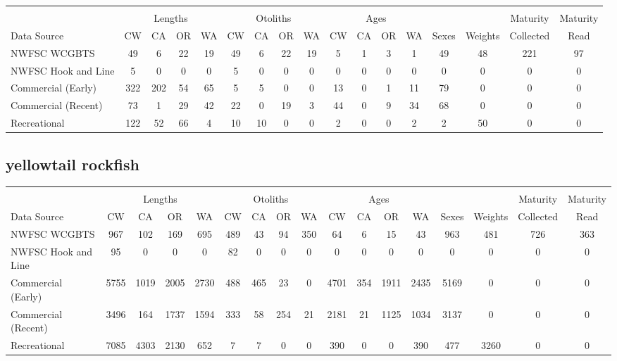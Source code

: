 \documentclass[12pt,]{article}
\begin{document}
\begin{table}[ht]
\centering
\begingroup\fontsize{10pt}{10pt}\selectfont
\begin{tabular}{|l|cccc|cccc|cccc|c|c|c|c|}
  \hline
 &  &  &  &  &  &  &  &  &  &  &  &  &  &  &  &  \\ 
   & \multicolumn{4}{c}{Lengths} &  \multicolumn{4}{c}{Otoliths} & \multicolumn{4}{c}{Ages} &  & & Maturity & Maturity\\
 Data Source & CW & CA & OR & WA & CW & CA & OR & WA & CW & CA & OR & WA & Sexes & Weights & Collected & Read\\
 \hline
NWFSC WCGBTS & 49 & 6 & 22 & 19 & 49 & 6 & 22 & 19 & 5 & 1 & 3 & 1 & 49 & 48 & 221 & 97 \\ 
  NWFSC Hook and Line & 5 & 0 & 0 & 0 & 5 & 0 & 0 & 0 & 0 & 0 & 0 & 0 & 0 & 0 & 0 & 0 \\ 
  Commercial (Early) & 322 & 202 & 54 & 65 & 5 & 5 & 0 & 0 & 13 & 0 & 1 & 11 & 79 & 0 & 0 & 0 \\ 
  Commercial (Recent) & 73 & 1 & 29 & 42 & 22 & 0 & 19 & 3 & 44 & 0 & 9 & 34 & 68 & 0 & 0 & 0 \\ 
  Recreational & 122 & 52 & 66 & 4 & 10 & 10 & 0 & 0 & 2 & 0 & 0 & 2 & 2 & 50 & 0 & 0 \\ 
   \hline
\end{tabular}
\endgroup
\end{table}

\FloatBarrier  

\newpage  

\subsection{yellowtail rockfish}\label{yellowtail-rockfish}

\begin{table}[ht]
\centering
\begingroup\fontsize{10pt}{10pt}\selectfont
\begin{tabular}{|l|cccc|cccc|cccc|c|c|c|c|}
  \hline
 &  &  &  &  &  &  &  &  &  &  &  &  &  &  &  &  \\ 
   & \multicolumn{4}{c}{Lengths} &  \multicolumn{4}{c}{Otoliths} & \multicolumn{4}{c}{Ages} &  & & Maturity & Maturity\\
 Data Source & CW & CA & OR & WA & CW & CA & OR & WA & CW & CA & OR & WA & Sexes & Weights & Collected & Read\\
 \hline
NWFSC WCGBTS & 967 & 102 & 169 & 695 & 489 & 43 & 94 & 350 & 64 & 6 & 15 & 43 & 963 & 481 & 726 & 363 \\ 
  NWFSC Hook and Line & 95 & 0 & 0 & 0 & 82 & 0 & 0 & 0 & 0 & 0 & 0 & 0 & 0 & 0 & 0 & 0 \\ 
  Commercial (Early) & 5755 & 1019 & 2005 & 2730 & 488 & 465 & 23 & 0 & 4701 & 354 & 1911 & 2435 & 5169 & 0 & 0 & 0 \\ 
  Commercial (Recent) & 3496 & 164 & 1737 & 1594 & 333 & 58 & 254 & 21 & 2181 & 21 & 1125 & 1034 & 3137 & 0 & 0 & 0 \\ 
  Recreational & 7085 & 4303 & 2130 & 652 & 7 & 7 & 0 & 0 & 390 & 0 & 0 & 390 & 477 & 3260 & 0 & 0 \\ 
   \hline
\end{tabular}
\endgroup
\end{table}
\end{document}
